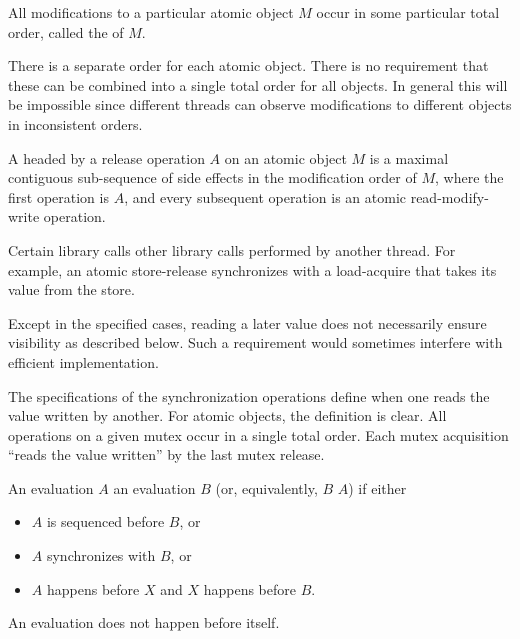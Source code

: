 \pnum
All modifications to a particular atomic object $M$ occur in some
particular total order, called the  of $M$.
\begin{note}
There is a separate order for each
atomic object. There is no requirement that these can be combined into a single
total order for all objects. In general this will be impossible since different
threads can observe modifications to different objects in inconsistent orders.
\end{note}

\pnum
A  headed
by a release operation $A$ on an atomic object $M$
is a maximal contiguous sub-sequence of
%
side effects in the modification order of $M$,
where the first operation is $A$, and
every subsequent operation is an atomic read-modify-write operation.

\pnum
Certain library calls  other library calls performed by
another thread. For example, an atomic store-release synchronizes with a
load-acquire that takes its value from the store.
\begin{note}
Except in the specified cases, reading a later value does not
necessarily ensure visibility as described below. Such a requirement would
sometimes interfere with efficient implementation.
\end{note}
\begin{note}
The
specifications of the synchronization operations define when one reads the value
written by another. For atomic objects, the definition is clear. All operations
on a given mutex occur in a single total order. Each mutex acquisition ``reads
the value written'' by the last mutex release.
\end{note}

\pnum
An evaluation $A$  an evaluation $B$
(or, equivalently, $B$  $A$)
if either
\begin{itemize}
\item $A$ is sequenced before $B$, or
\item $A$ synchronizes with $B$, or
\item $A$ happens before $X$ and $X$ happens before $B$.
\end{itemize}
\begin{note}
An evaluation does not happen before itself.
\end{note}

